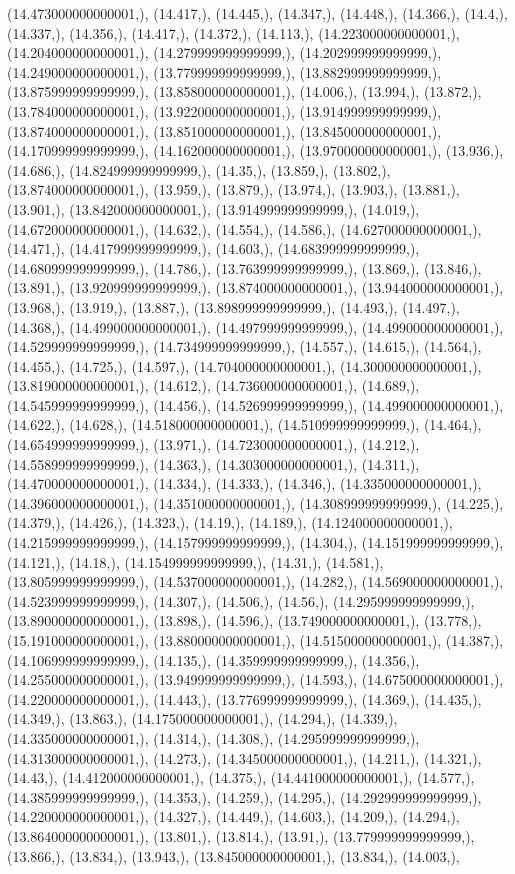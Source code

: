 \documentclass{article}
\begin{document}
(14.473000000000001,), (14.417,), (14.445,), (14.347,), (14.448,), (14.366,), (14.4,), (14.337,), (14.356,), (14.417,), (14.372,), (14.113,), (14.223000000000001,), (14.204000000000001,), (14.279999999999999,), (14.202999999999999,), (14.249000000000001,), (13.779999999999999,), (13.882999999999999,), (13.875999999999999,), (13.858000000000001,), (14.006,), (13.994,), (13.872,), (13.784000000000001,), (13.922000000000001,), (13.914999999999999,), (13.874000000000001,), (13.851000000000001,), (13.845000000000001,), (14.170999999999999,), (14.162000000000001,), (13.970000000000001,), (13.936,), (14.686,), (14.824999999999999,), (14.35,), (13.859,), (13.802,), (13.874000000000001,), (13.959,), (13.879,), (13.974,), (13.903,), (13.881,), (13.901,), (13.842000000000001,), (13.914999999999999,), (14.019,), (14.672000000000001,), (14.632,), (14.554,), (14.586,), (14.627000000000001,), (14.471,), (14.417999999999999,), (14.603,), (14.683999999999999,), (14.680999999999999,), (14.786,), (13.763999999999999,), (13.869,), (13.846,), (13.891,), (13.920999999999999,), (13.874000000000001,), (13.944000000000001,), (13.968,), (13.919,), (13.887,), (13.898999999999999,), (14.493,), (14.497,), (14.368,), (14.499000000000001,), (14.497999999999999,), (14.499000000000001,), (14.529999999999999,), (14.734999999999999,), (14.557,), (14.615,), (14.564,), (14.455,), (14.725,), (14.597,), (14.704000000000001,), (14.300000000000001,), (13.819000000000001,), (14.612,), (14.736000000000001,), (14.689,), (14.545999999999999,), (14.456,), (14.526999999999999,), (14.499000000000001,), (14.622,), (14.628,), (14.518000000000001,), (14.510999999999999,), (14.464,), (14.654999999999999,), (13.971,), (14.723000000000001,), (14.212,), (14.558999999999999,), (14.363,), (14.303000000000001,), (14.311,), (14.470000000000001,), (14.334,), (14.333,), (14.346,), (14.335000000000001,), (14.396000000000001,), (14.351000000000001,), (14.308999999999999,), (14.225,), (14.379,), (14.426,), (14.323,), (14.19,), (14.189,), (14.124000000000001,), (14.215999999999999,), (14.157999999999999,), (14.304,), (14.151999999999999,), (14.121,), (14.18,), (14.154999999999999,), (14.31,), (14.581,), (13.805999999999999,), (14.537000000000001,), (14.282,), (14.569000000000001,), (14.523999999999999,), (14.307,), (14.506,), (14.56,), (14.295999999999999,), (13.890000000000001,), (13.898,), (14.596,), (13.749000000000001,), (13.778,), (15.191000000000001,), (13.880000000000001,), (14.515000000000001,), (14.387,), (14.106999999999999,), (14.135,), (14.359999999999999,), (14.356,), (14.255000000000001,), (13.949999999999999,), (14.593,), (14.675000000000001,), (14.220000000000001,), (14.443,), (13.776999999999999,), (14.369,), (14.435,), (14.349,), (13.863,), (14.175000000000001,), (14.294,), (14.339,), (14.335000000000001,), (14.314,), (14.308,), (14.295999999999999,), (14.313000000000001,), (14.273,), (14.345000000000001,), (14.211,), (14.321,), (14.43,), (14.412000000000001,), (14.375,), (14.441000000000001,), (14.577,), (14.385999999999999,), (14.353,), (14.259,), (14.295,), (14.292999999999999,), (14.220000000000001,), (14.327,), (14.449,), (14.603,), (14.209,), (14.294,), (13.864000000000001,), (13.801,), (13.814,), (13.91,), (13.779999999999999,), (13.866,), (13.834,), (13.943,), (13.845000000000001,), (13.834,), (14.003,), 
\end{document}
